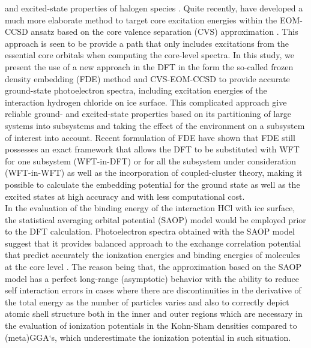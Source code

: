 \documentclass[a4paper,11pt]{report}
\begin{document}
and excited-state properties of halogen species \citep{shee2018equation,bouchafra2018predictive}. 
Quite recently, \citep{peng2015energy} have developed a much more elaborate method to target core
excitation energies within the EOM-CCSD ansatz based on the core valence separation (CVS) approximation \citep{cederbaum1980many}. This approach is seen to be
provide a path that only includes excitations from the essential core orbitals when computing the core-level spectra. 
In this study, we present the use of a new approach in the DFT in the form the so-called frozen density embedding (FDE) method and  CVS-EOM-CCSD 
to provide accurate ground-state photoelectron spectra, including excitation energies of the interaction hydrogen chloride on ice surface. This complicated approach give reliable ground- and excited-state properties based on its partitioning of large systems into subsystems and
taking the effect of the environment on a subsystem of interest into account. Recent formulation of FDE have shown that FDE still possesses an exact framework that allows the DFT to be substituted with WFT for one subsystem (WFT-in-DFT) \citep{gomes2008calculation,hofener2013solvatochromic,daday2013state} or for all the
subsystem under consideration (WFT-in-WFT) \citep{hofener2012calculation} as well as the incorporation of coupled-cluster theory, making it possible to calculate the embedding potential for the ground state as well as the excited states at high accuracy and with less computational cost.\\
In the evaluation of the binding energy of the interaction HCl with ice surface, the statistical averaging orbital potential (SAOP) model \citep{schipper2000molecular} would be employed prior to the DFT calculation. Photoelectron spectra obtained with the SAOP model suggest that it provides balanced approach to the exchange correlation potential that predict accurately the ionization energies \citep{lemierre2005calculation, segala2009evaluation} and binding energies of molecules at the core level \citep{takahata2003dft}. The reason being that, the approximation based on the SAOP model has a perfect long-range (asymptotic) behavior with the ability to reduce self interaction errors in cases where there are discontinuities in the derivative of the total energy as the  number of particles varies and also to correctly depict atomic shell structure both in the inner and outer regions which are necessary in the evaluation of ionization potentials in the Kohn-Sham densities\citep{tecmer2011electronic} compared to (meta)GGA`s, which underestimate the ionization potential in such situation. 
\end{document}
